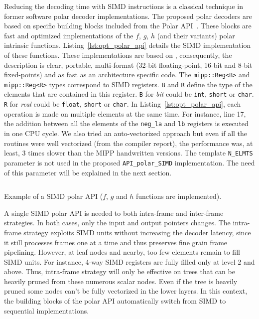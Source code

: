 Reducing the decoding time with SIMD instructions is a classical technique in
former software polar decoder implementations. The proposed polar decoders are
based on specific building blocks included from the Polar
API~\cite{Cassagne2015c,Cassagne2016b}. These blocks are fast and optimized
implementations of the $f$, $g$, $h$ (and their variants) polar intrinsic
functions. Listing~\ref{lst:opt_polar_api} details the SIMD implementation of
these functions. These implementations are based on \MIPP, consequently, the
description is clear, portable, multi-format (32-bit floating-point, 16-bit and
8-bit fixed-points) and as fast as an architecture specific code. The
\verb|mipp::Reg<B>| and \verb|mipp::Reg<R>| types correspond to SIMD registers.
\verb|B| and \verb|R| define the type of the elements that are contained in this
register. \verb|B| for \textit{bit} could be \verb|int|, \verb|short| or
\verb|char|. \verb|R| for \textit{real} could be \verb|float|, \verb|short| or
\verb|char|. In Listing~\ref{lst:opt_polar_api}, each operation is made on
multiple elements at the same  time. For instance, line 17, the addition between
all the elements of the \verb|neg_la| and \verb|lb| registers is executed in one
CPU cycle. We also tried an auto-vectorized approach but even if all the
routines were well vectorized (from the compiler report), the performance was,
at least, 3 times slower than the MIPP handwritten versions. The template
\verb|N_ELMTS| parameter is not used in the proposed \verb|API_polar_SIMD|
implementation. The need of this parameter will be explained in the next
section.

\begin{listing}%
  \inputminted[frame=lines,linenos]{C++}{main/chapter3/src/polar/f_g_h_simd.cpp}
  \caption{Example of a \Cxx SIMD polar API ($f$, $g$ and $h$ functions are
    implemented).}
  \label{lst:opt_polar_api}
\end{listing}

A single SIMD polar API is needed to both intra-frame and inter-frame
strategies. In both cases, only the input and output pointers changes. The
intra-frame strategy exploits SIMD units without increasing the decoder latency,
since it still processes frames one at a time and thus preserves fine grain
frame pipelining. However, at leaf nodes and nearby, too few elements remain to
fill SIMD units. For instance, 4-way SIMD registers are fully filled only at
level 2 and above. Thus, intra-frame strategy will only be effective on trees
that can be heavily pruned from these numerous scalar nodes. Even if the tree is
heavily pruned some nodes can't be fully vectorized in the lower layers. In this
context, the building blocks of the polar API automatically switch from SIMD to
sequential implementations.

